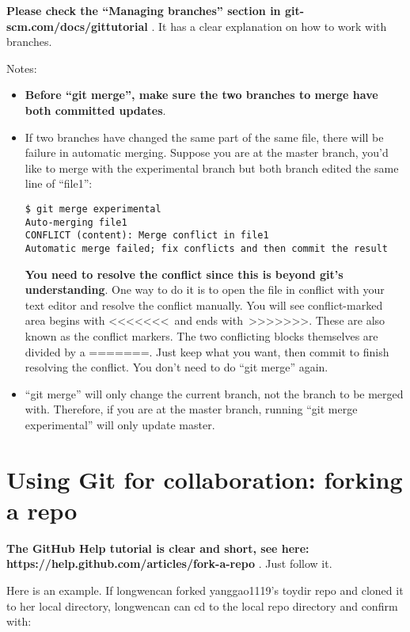 \documentclass{article} %
\newcommand{\q}[1]{``#1''}
\begin{document}
\textbf{Please check the \q{Managing branches} section in git-scm.com/docs/gittutorial} . It has a clear explanation on how to work with branches.

Notes:

\begin{itemize}
	\item \textbf{Before \q{git merge}, make sure the two branches to merge have both committed updates}.

	\item If two branches have changed the same part of the same file, there will be failure in automatic merging. Suppose you are at the master branch, you'd like to merge with the experimental branch but both branch edited the same line of \q{file1}:

\begin{lstlisting}
$ git merge experimental
Auto-merging file1
CONFLICT (content): Merge conflict in file1
Automatic merge failed; fix conflicts and then commit the result
\end{lstlisting}

\textbf{You need to resolve the conflict since this is beyond git's understanding}. One way to do it is to open the file in conflict with your text editor and resolve the conflict manually. You will see conflict-marked area begins with \textless\textless\textless\textless\textless\textless\textless~and ends with~\textgreater\textgreater\textgreater\textgreater\textgreater\textgreater\textgreater. These are also known as the conflict markers. The two conflicting blocks themselves are divided by a =======. Just keep what you want, then commit to finish resolving the conflict. You don't need to do \q{git merge} again. 

	\item \q{git merge} will only change the current branch, not the branch to be merged with. Therefore, if you are at the master branch, running \q{git merge experimental} will only update master.

\end{itemize}

\section{Using Git for collaboration: forking a repo}

\textbf{The GitHub Help tutorial is clear and short, see here: https://help.github.com/articles/fork-a-repo} . Just follow it. 

Here is an example. If longwencan forked yanggao1119's toydir repo and cloned it to her local directory, longwencan can cd to the local repo directory and confirm with:
\end{document}
